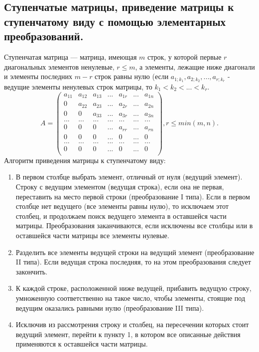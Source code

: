 \documentclass[a4paper,14pt]{article}
\begin{document}
\subsection{Ступенчатые матрицы, приведение матрицы к ступенчатому виду с помощью элементарных преобразований.}
Ступенчатая матрица — матрица, имеющая $m$ строк, у которой первые $r$ диагональных элементов ненулевые, $r \le m$, а элементы, лежащие ниже диагонали и элементы последних $m-r$ строк равны нулю (если $a_{1;k_1}, a_{2;k_2},...,a_{r;k_r}$ - ведущие элементы ненулевых строк матрицы, то $k_1 < k_2 < ... < k_r$.
\[
A=
\begin{pmatrix}
a_{11} & a_{12} & a_{13} & ... & a_{1r} & ... & a_{1n} \\
0 & a_{22} & a_{23} & ... & a_{2r} & ... & a_{2n} \\
0 & 0 & a_{33} & ... & a_{3r} & ... & a_{3n} \\
... & ... & ... & ... & ... & ... & ... \\
0 & 0 & 0 & ... & a_{rr} & ... & a_{rn} \\
0 & 0 & 0 & ... & 0 & ... & 0 \\
... & ... & ... & ... & ... & ... & ... \\
0 & 0 & 0 & ... & 0 & ... & 0 \\
\end{pmatrix}, r \le min(m, n).
\]
\noindent Алгоритм приведения матрицы к ступенчатому виду:
\begin{enumerate}
	\item В первом столбце выбрать элемент, отличный от нуля (ведущий элемент). Строку с ведущим элементом (ведущая строка), если она не первая, переставить на место первой строки (преобразование I типа). Если в первом столбце нет ведущего (все элементы равны нулю), то исключаем этот столбец, и продолжаем поиск ведущего элемента в оставшейся части матрицы. Преобразования заканчиваются, если исключены все столбцы или в оставшейся части матрицы все элементы нулевые.
	\item Разделить все элементы ведущей строки на ведущий элемент (преобразование II типа). Если ведущая строка последняя, то на этом преобразования следует закончить.
	\item К каждой строке, расположенной ниже ведущей, прибавить ведущую строку, умноженную соответственно на такое число, чтобы элементы, стоящие под ведущим оказались равными нулю (преобразование III типа).
	\item Исключив из рассмотрения строку и столбец, на пересечении которых стоит ведущий элемент, перейти к пункту 1, в котором все описанные действия применяются к оставшейся части матрицы.
\end{enumerate}
\end{document}
